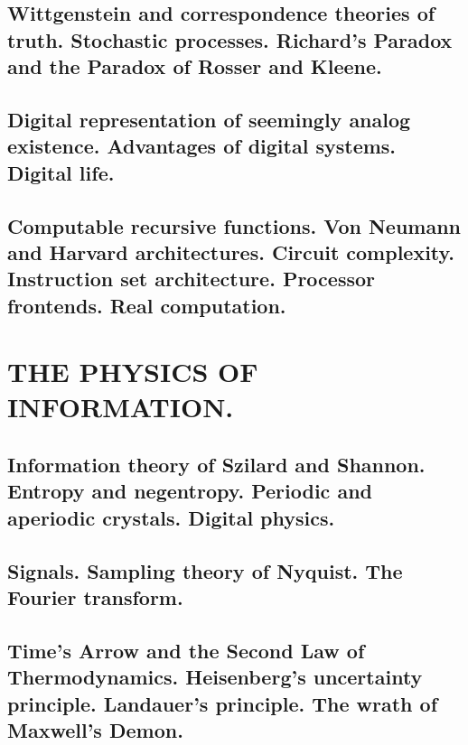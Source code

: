 \documentclass[letterpaper,draft]{memoir}
\begin{document}
\chapter{Wittgenstein and correspondence theories of truth. Stochastic processes.
Richard's Paradox and the Paradox of Rosser and Kleene.}

\chapter{Digital representation of seemingly analog existence. Advantages of digital
systems. Digital life.}

\chapter{Computable recursive functions. Von Neumann and Harvard architectures.
Circuit complexity. Instruction set architecture. Processor frontends. Real computation.}

\part{THE PHYSICS OF INFORMATION\@.}


\chapter{Information theory of Szilard and Shannon. Entropy and negentropy. Periodic
and aperiodic crystals. Digital physics.}

\chapter{Signals. Sampling theory of Nyquist. The Fourier transform.}

\chapter{Time's Arrow and the Second Law of Thermodynamics. Heisenberg's uncertainty
principle. Landauer's principle. The wrath of Maxwell's Demon.}
\end{document}
